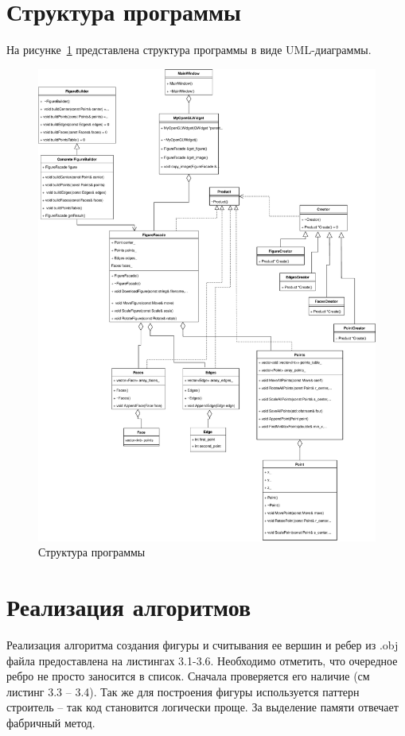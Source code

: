 \section{Структура программы}
На рисунке~\ref{fig:uml_programm} представлена структура программы в виде UML-диаграммы.

\begin{figure}[H]
	\centering
	\includegraphics[scale=0.54]{images/programm.pdf}
	\caption{Структура программы}
	\label{fig:uml_programm}
\end{figure}

\newpage

\section{Реализация алгоритмов}
Реализация алгоритма создания фигуры и считывания ее вершин и ребер из .obj файла предоставлена на листингах 3.1-3.6.
Необходимо отметить, что очередное ребро не просто заносится в список. 
Сначала проверяется его наличие (см листинг 3.3 – 3.4). 
Так же для построения фигуры используется паттерн строитель – так код становится логически проще.
За выделение памяти отвечает фабричный метод.


